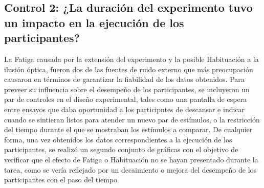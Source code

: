 \begin{itemize}

\end{itemize}










\subsection{Control 2: ¿La duración del experimento tuvo un impacto en la ejecución de los participantes?}

La Fatiga causada por la extensión del experimento y la posible Habituación a la ilusión óptica, fueron dos de las fuentes de ruido externo que más preocupación causaron en términos de garantizar la fiabilidad de los datos obtenidos. Para preveer su influencia sobre el desempeño de los participantes, se incluyeron un par de controles en el diseño experimental, tales como una pantalla de espera entre ensayos que daba oportunidad a los participntes de descansar e indicar cuando se sintieran listos para atender un nuevo par de estímulos, o la restricción del tiempo durante el que se mostraban los estímulos a comparar. De cualquier forma, una vez obtenidos los datos correspondientes a la ejecución de los participantes, se realizó un segundo conjunto de gráficas con el objetivo de verificar que el efecto de Fatiga o Habituación no se hayan presentado durante la tarea, como se vería reflejado por un decaimiento o mejora del desempeño de los participantes con el paso del tiempo.\\ 

